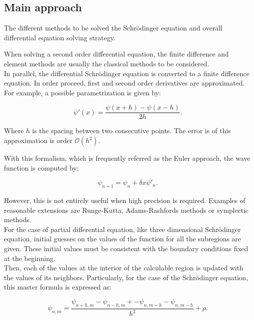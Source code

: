 \documentclass[openany]{book}
\begin{document}
\subsection{Main approach} \label{sub:diffSolvingMainApproach}

The different methods to be solved the Schrödinger equation and overall differential equation solving strategy. 

When solving a second order differential equation, the finite difference and element methods are usually the classical methods to be considered.  \\

In parallel, the differential Schrödinger equation is converted to a finite difference equation. In order proceed, first and second order derivatives are approximated. For example, a possible parametrization is given by:

\begin{equation}\label{eq:numericalIntegration_central_derivative}
	\psi'(x) = \frac{\psi(x + h) - \psi(x - h)}{2h}. 
\end{equation}

Where $h$ is the spacing between two consecutive points. The error is of this approximation is order $\mathcal{O}(h^2)$. 

With this formalism, which is frequently referred as the Euler approach, the wave function is computed by: 

\begin{equation}\label{eq:numericalIntegration_Euler_approximation}
	\psi_{n+1} = \psi_{n} + \delta x \psi'_{n}.
\end{equation}

However, this is not entirely useful when high precision is required. Examples of reasonable extensions are Runge-Kutta, Adams-Rashfords methods or symplectic methods. \\


For the case of partial differential equation, like three dimensional Schrödinger equation,  initial guesses on the values of the function for all the  subregions are given. These initial values must be consistent with the boundary conditions fixed at the beginning. \\

Then, each of the values at the interior of the calculable region is updated with the values of its neighbors. Particularly, for the case of the Schrödinger equation, this master formula is expressed as:

\begin{equation}\label{eq:numericalIntegration_elements_formula}
	\psi_{n,m} = \frac{\psi_{n + h, m}  -  \psi_{n - h, m}  +  -  \psi_{n, m + h} - \psi_{n, m - h} }{h^2} + \rho.
\end{equation}
\end{document}
